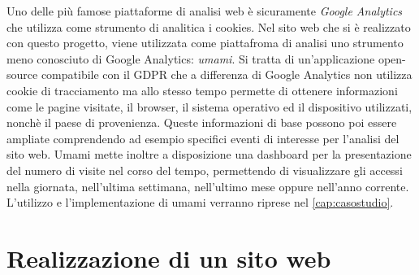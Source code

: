 \documentclass[target=bach,aauheader=]{thud}
\begin{document}
Uno delle più famose piattaforme di analisi web è sicuramente \textit{Google Analytics} che utilizza come strumento di analitica i cookies. 
Nel sito web che si è realizzato con questo progetto, viene utilizzata come piattafroma di analisi uno strumento meno conosciuto di Google Analytics: \textit{umami}. 
Si tratta di un'applicazione open-source compatibile con il GDPR che a differenza di Google Analytics non utilizza cookie di tracciamento ma allo stesso tempo permette di ottenere informazioni come le pagine visitate, il browser, il sistema operativo ed il dispositivo utilizzati, nonchè il paese di provenienza. Queste informazioni di base possono poi essere ampliate comprendendo ad esempio specifici eventi di interesse per l'analisi del sito web.
Umami mette inoltre a disposizione una dashboard per la presentazione del numero di visite nel corso del tempo, permettendo di visualizzare gli accessi nella giornata, nell'ultima settimana, nell'ultimo mese oppure nell'anno corrente. 
\newline 
L'utilizzo e l'implementazione di umami verranno riprese nel \cref{cap:casostudio}.


\chapter{Realizzazione di un sito web}
\end{document}
